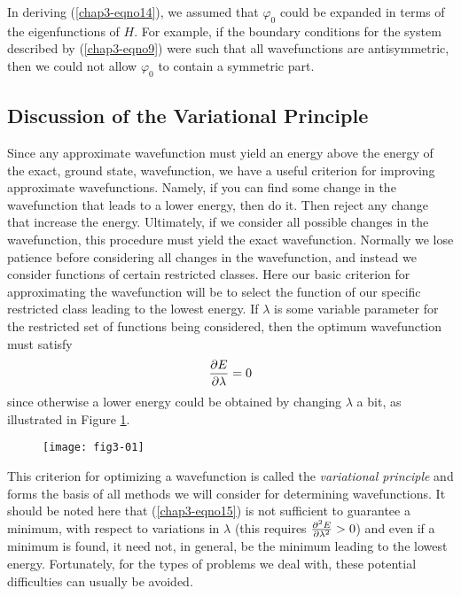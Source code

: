 In deriving (\ref{chap3-eqno14}), we assumed that $\varphi_0$ could be
expanded in terms of the eigenfunctions of $H$. For
example, if the boundary conditions for the system described by
(\ref{chap3-eqno9}) were such that all wavefunctions are antisymmetric,
then we could not allow $\varphi_0$ to contain a symmetric part.

\subsection{Discussion of the Variational Principle}

Since any approximate wavefunction must yield an energy above the
energy of the exact, ground state, wavefunction, we have a useful
criterion for improving approximate wavefunctions. Namely, if you can
find some change in the wavefunction that leads to a lower energy,
then do it. Then reject any change that increase the energy.
Ultimately, if we consider all possible changes in the wavefunction,
this procedure must yield the exact wavefunction.  Normally we lose
patience before considering all changes in the wavefunction, and
instead we consider functions of certain restricted classes. Here our
basic criterion for approximating the wavefunction will be to select
the function of our specific restricted class leading to the lowest
energy. If $\lambda$ is some variable parameter for the restricted set
of functions being considered, then the optimum wavefunction must
satisfy
\begin{equation}
{\partial E \over \partial \lambda} = 0
\label{chap3-eqno15}
\end{equation}
since otherwise a lower energy could be obtained by changing $\lambda$ a 
bit, as illustrated in Figure \ref{fig3-01}.

\begin{figure}
\begin{center}
\texttt{[image: fig3-01]}
\end{center}
\caption{}
\label{fig3-01}
\end{figure}

\noindent
This criterion for optimizing a wavefunction is called the
\emph{variational principle} and forms the basis of all methods we
will consider for determining wavefunctions. It should be noted here
that (\ref{chap3-eqno15}) is not sufficient to guarantee a minimum, with
respect to variations in $\lambda$ (this requires 
${\partial^2 E \over \partial \lambda^2} > 0$)
and even if a minimum is found, it need not, in general, be the minimum 
leading to the lowest energy.  Fortunately, for the types of problems we 
deal with, these potential difficulties can usually be avoided.


